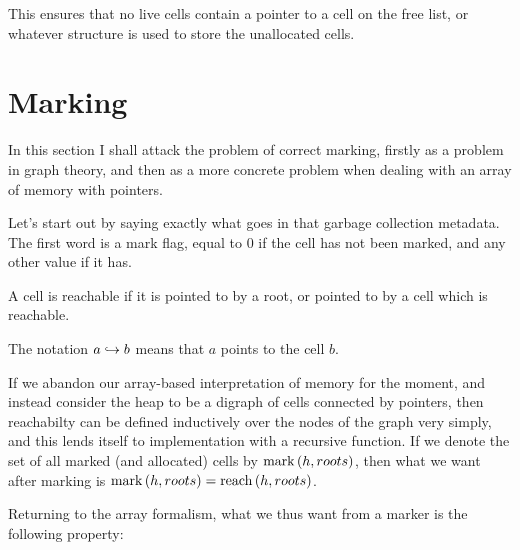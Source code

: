 This ensures that no live cells contain a pointer to a cell on the
free list, or whatever structure is used to store the unallocated
cells.

\section{Marking}
\label{sec:marksweep-marking}

In this section I shall attack the problem of correct marking, firstly
as a problem in graph theory, and then as a more concrete problem when
dealing with an array of memory with pointers.

Let's start out by saying exactly what goes in that garbage collection
metadata. The first word is a mark flag, equal to 0 if the cell has
not been marked, and any other value if it has.

\begin{definition}[Reachable]
  \label{def:ms-reachable}
  A cell is reachable if it is pointed to by a root, or pointed to by
  a cell which is reachable.

  \begin{minipage}{.5\textwidth}
    \begin{prooftree}
    \end{prooftree}
  \end{minipage}
  \begin{minipage}{.5\textwidth}
    \begin{prooftree}
    \end{prooftree}
  \end{minipage}

  The notation $a \pointsto b$ means that $a$ points to the cell $b$.
\end{definition}

If we abandon our array-based interpretation of memory for the moment,
and instead consider the heap to be a digraph of cells connected by
pointers, then reachabilty can be defined inductively over the nodes
of the graph very simply, and this lends itself to implementation with
a recursive function. If we denote the set of all marked (and
allocated) cells by $\markset{h}{roots}$, then what we want after
marking is $\markset{h}{roots} = \reach{h}{roots}$.

Returning to the array formalism, what we thus want from a marker is
the following property:

